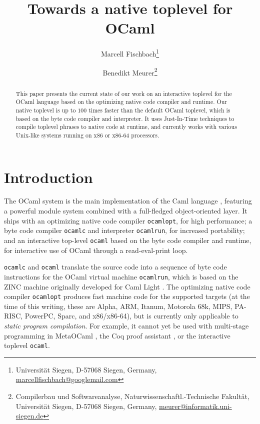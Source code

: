 \documentclass[10pt,a4paper,draft,twocolumn]{article}
\begin{document}
\title{%
  Towards a native toplevel for OCaml
}
\author{%
  Marcell Fischbach\thanks{
    Universit\"at Siegen,
    D-57068 Siegen,
    Germany,
    \url{marcellfischbach@googlemail.com}
  }
  \and
  Benedikt Meurer\thanks{
    Compilerbau und Softwareanalyse,
    Naturwissenschaftl.-Technische Fakult\"at,
    Universit\"at Siegen,
    D-57068 Siegen,
    Germany,
    \url{meurer@informatik.uni-siegen.de}
  }
}
\date{}

\maketitle

\begin{abstract}
  This paper presents the current state of our work on an interactive toplevel for the OCaml language
  based on the optimizing native code compiler and runtime. Our native toplevel is up to $100$ times
  faster than the default OCaml toplevel, which is based on the byte code compiler and interpreter.
  It uses Just-In-Time techniques to compile toplevel phrases to native code at runtime, and
  currently works with various Unix-like systems running on x86 or x86-64 processors.
\end{abstract}


\section{Introduction}

The OCaml \cite{Leroy11,Remy02} system is the main implementation of the Caml
language \cite{Caml11}, featuring a powerful module system
combined with a full-fledged object-oriented layer. It ships with an optimizing native
code compiler \texttt{ocamlopt}, for high performance; a byte code compiler \texttt{ocamlc}
and interpreter \texttt{ocamlrun}, for increased portability; and an interactive top-level
\texttt{ocaml} based on the byte code compiler and runtime, for interactive use of OCaml
through a read-eval-print loop.

\texttt{ocamlc} and \texttt{ocaml} translate the source code into a sequence of byte code
instructions for the OCaml virtual machine \texttt{ocamlrun}, which is based on the ZINC
machine \cite{Leroy90} originally developed for Caml Light \cite{Leroy02}. The optimizing
native code compiler \texttt{ocamlopt} produces fast machine code for the supported targets
(at the time of this writing, these are Alpha, ARM, Itanum, Motorola 68k, MIPS, PA-RISC, PowerPC,
Sparc, and x86/x86-64), but is currently only applicable to \emph{static program compilation}.
For example, it cannot yet be used with multi-stage programming in MetaOCaml \cite{Taha03,Taha06},
the Coq proof assistant \cite{Bertot04,Coq10}, or the interactive toplevel \texttt{ocaml}.
\end{document}
